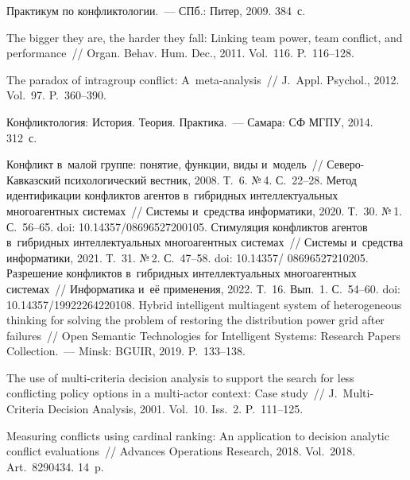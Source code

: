 \begin{multicols}{2}
{{\begin{thebibliography}{99}
   Практикум по конфликтологии.~--- СПб.: Питер, 2009. 384~с.

 
   The bigger they are, the harder they fall: Linking 
team power, team conflict, and performance~// Organ. Behav. Hum. Dec., 2011. Vol.~116. P.~116--128.

   The paradox of intragroup conflict:  
A~meta-analysis~// J.~Appl. Psychol., 2012. Vol.~97. P.~360--390.

   Конфликтология: История. Теория. Практика.~--- 
Самара: СФ МГПУ, 2014. 312~с.
 
 
   Конфликт в~малой группе: понятие, функции, виды и~модель~//  
Се\-ве\-ро-Кав\-каз\-ский психологический вестник, 2008. Т.~6. №\,4. С.~22--28.
   Метод идентификации конфликтов агентов 
 в~гиб\-рид\-ных интеллектуальных многоагентных системах~// Сис\-те\-мы и~средства 
информатики, 2020. Т.~30. №\,1. С.~56--65. doi: 10.14357/08696527200105.
   Стимуляция конфликтов агентов  
в~гиб\-рид\-ных интеллектуальных многоагентных сис\-те\-мах~// Сис\-те\-мы и~средства 
информатики, 2021. Т.~31. №\,2. С.~47--58. doi: 10.14357/ 08696527210205.
   Разрешение конфликтов 
 в~гиб\-рид\-ных интеллектуальных многоагентных сис\-те\-мах~// Информатика и~её 
применения, 2022. Т.~16. Вып.~1. С.~54--60. doi: 10.14357/19922264220108.
   Hybrid intelligent multiagent system of heterogeneous 
thinking for solving the problem of restoring the distribution power grid after failures~// Open 
Semantic Technologies for Intelligent Systems: Research Papers Collection.~--- Minsk: BGUIR, 
2019. P.~133--138.
 
   The use of multi-criteria decision analysis to support the search for less 
conflicting policy options in a multi-actor context: Case study~// J.~Multi-Criteria Decision 
Analysis, 2001. Vol.~10. Iss.~2. P.~111--125.

   Measuring conflicts using cardinal 
ranking: An application to decision analytic conflict evaluations~// Advances Operations Research, 
2018. Vol.~2018. Art.~8290434. 14~p.


\end{thebibliography}}}
\end{multicols}
